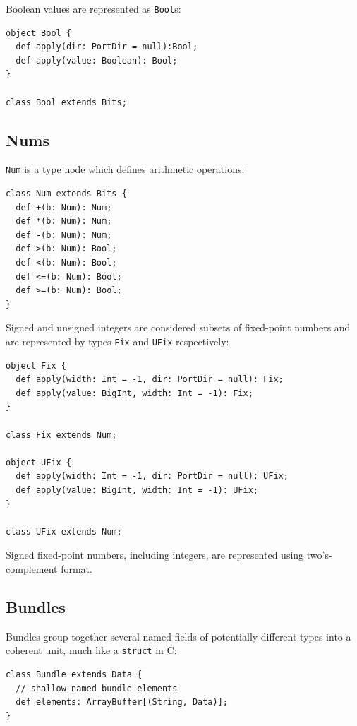 \documentclass[10pt,twocolumn]{article}
\def\code#1{{\small\tt #1}}
\begin{document}
Boolean values are represented as \code{Bool}s:

\begin{lstlisting}
object Bool {
  def apply(dir: PortDir = null):Bool;
  def apply(value: Boolean): Bool;
}

class Bool extends Bits;
\end{lstlisting}

\subsection{Nums}

\code{Num} is a type node which defines arithmetic operations:

\begin{lstlisting}
class Num extends Bits {
  def +(b: Num): Num;
  def *(b: Num): Num;
  def -(b: Num): Num;
  def >(b: Num): Bool;
  def <(b: Num): Bool;
  def <=(b: Num): Bool;
  def >=(b: Num): Bool;
}
\end{lstlisting}

Signed and unsigned integers
are considered subsets of fixed-point numbers and are represented by
types \code{Fix} and \code{UFix} respectively:

\begin{lstlisting}
object Fix {
  def apply(width: Int = -1, dir: PortDir = null): Fix;
  def apply(value: BigInt, width: Int = -1): Fix;
}

class Fix extends Num; 

object UFix {
  def apply(width: Int = -1, dir: PortDir = null): UFix;
  def apply(value: BigInt, width: Int = -1): UFix;
}

class UFix extends Num; 
\end{lstlisting}

\noindent
Signed fixed-point
numbers, including integers, are represented using two's-complement
format.  

\subsection{Bundles}

Bundles group together several named fields of potentially different
types into a coherent unit, much like a \code{struct} in C:

\begin{lstlisting}
class Bundle extends Data {
  // shallow named bundle elements
  def elements: ArrayBuffer[(String, Data)];
}
\end{lstlisting}
\end{document}
